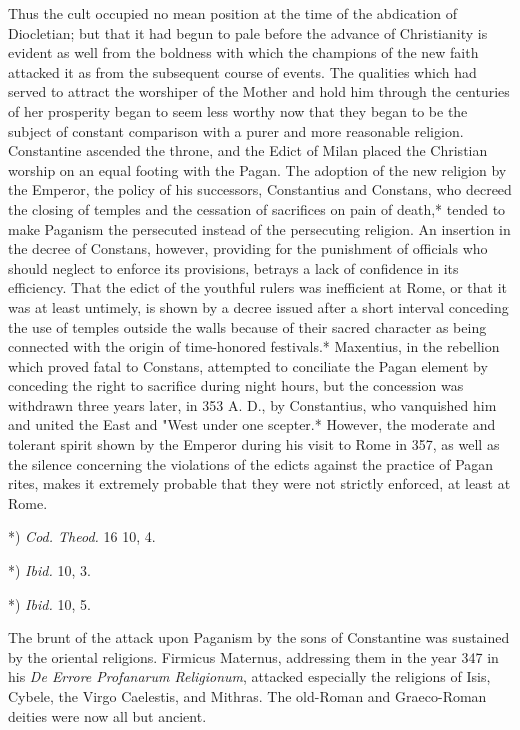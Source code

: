 \documentclass[a4paper, 11pt, oneside, polutonikogreek, english]{article}
\begin{document}
Thus the cult occupied no mean position at the time of the abdication of Diocletian; but that it had begun to pale before the advance of Christianity is evident as well from the boldness with which the champions of the new faith attacked it as from the subsequent course of events. The qualities which had served to attract the worshiper of the Mother and hold him through the centuries of her prosperity began to seem less worthy now that they began to be the subject of constant comparison with a purer and more reasonable religion. Constantine ascended the throne, and the Edict of Milan placed the Christian worship on an equal footing with the Pagan. The adoption of the new religion by the Emperor, the policy of his successors, Constantius and Constans, who decreed the closing of temples and the cessation of sacrifices on pain of death,* tended to make Paganism the persecuted instead of the persecuting religion. An insertion in the decree of Constans, however, providing for the punishment of officials who should neglect to enforce its provisions, betrays a lack of confidence in its efficiency. That the edict of the youthful rulers was inefficient at Rome, or that it was at least untimely, is shown by a decree issued after a short interval conceding the use of temples outside the walls because of their sacred character as being connected with the origin of time-honored festivals.* Maxentius, in the rebellion which proved fatal to Constans, attempted to conciliate the Pagan element by conceding the right to sacrifice during night hours, but the concession was withdrawn three years later, in 353 A. D., by Constantius, who vanquished him and united the East and "West under one scepter.* However, the moderate and tolerant spirit shown by the Emperor during his visit to Rome in 357, as well as the silence concerning the violations of the edicts against the practice of Pagan rites, makes it extremely probable that they were not strictly enforced, at least at Rome.

*) \emph{Cod. Theod.} 16 10, 4.

*) \emph{Ibid.} 10, 3.

*) \emph{Ibid.} 10, 5.

The brunt of the attack upon Paganism by the sons of Constantine was sustained by the oriental religions. Firmicus Maternus, addressing them in the year 347 in his \emph{De Errore Profanarum Religionum}, attacked especially the religions of Isis, Cybele, the Virgo Caelestis, and Mithras. The old-Roman and Graeco-Roman deities were now all but ancient.
\end{document}

